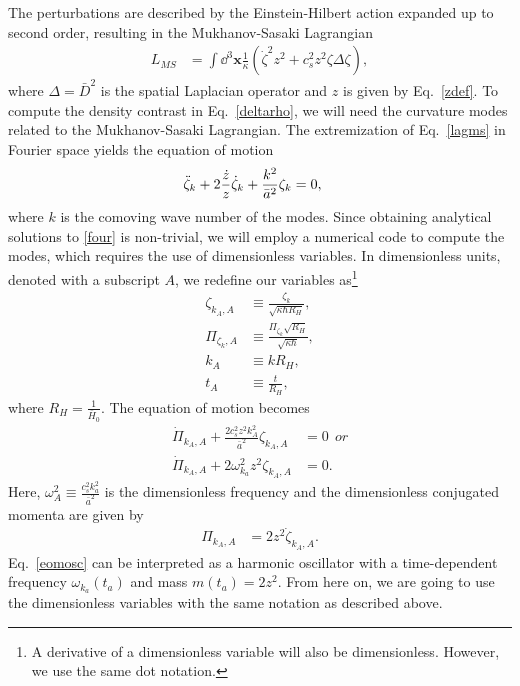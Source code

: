 \documentclass[a4paper,11pt]{article}
\begin{document}
The perturbations are described by the Einstein-Hilbert action expanded up to second
order, resulting in the Mukhanov-Sasaki Lagrangian
\begin{align}
	\label{lagms}
	L_{MS} & = \int \dd^3\textbf{x} \frac{1}{ \kappa} \left({\dot{\zeta}}^2 z^2 + c_s^2 z^2 \zeta\Delta \zeta\right)
	,\end{align}
where $\Delta = \bar{D}^2$ is the spatial Laplacian operator and $z$ is given by
Eq.~\eqref{zdef}. To compute the density contrast in Eq.~\eqref{deltarho}, we will need
the curvature modes related to the Mukhanov-Sasaki Lagrangian. The extremization of
Eq.~\eqref{lagms} in Fourier space yields the equation of motion
\begin{align}
	\label{four}
	\Ddot{\zeta}_{k}+ 2\frac{ \dot{z} }{ z } \dot{\zeta}_k + \frac{k^2}{\bar{a}^2} \zeta_k & =0
	,\end{align}
where $k$ is the comoving wave number of the modes. Since obtaining analytical solutions
to \eqref{four} is non-trivial, we will employ a numerical code to compute the modes,
which requires the use of dimensionless variables. In dimensionless units, denoted with
a subscript $A$, we redefine our variables as\footnote{A derivative of a dimensionless
	variable will also be dimensionless. However, we use the same dot notation.}
\begin{align}
	\zeta_{k_A, A}   & \equiv \frac{\zeta_{k}}{\sqrt{ \kappa \hbar R_H}},           \\
	\Pi_{\zeta_k, A} & \equiv \frac{\Pi_{\zeta_k} \sqrt{R_H}}{\sqrt{\kappa \hbar}}, \\
	\label{kadm}
	k_A              & \equiv k R_H,                                                \\
	t_A              & \equiv \frac{t}{R_H}
	,\end{align}
where $R_H = \frac{1}{\bar{H}_0}$. The equation of motion becomes
\begin{align}
	\label{eomosc}
	\dot{\Pi}_{k_A, A}+  \frac{2 c^2_s z^2 k_A^2}{\bar{a}^2  } \zeta_{k_A, A} & =0 \nonumber~~ or \\
	\dot{\Pi}_{k_A, A}+  2 \omega_{k_a}^2 z^2  \zeta_{k_A, A}                 & =0
	.\end{align}
Here, $\omega_A^2 \equiv \frac{c_s^2 k_a^2}{\bar{a}^2}$ is the dimensionless frequency
and the dimensionless conjugated momenta are given by
\begin{align}
	\Pi_{k_A, A} & = 2 z^2 \dot{\zeta}_{k_A, A}
	.\end{align}
Eq.~\eqref{eomosc} can be interpreted as a harmonic oscillator with a time-dependent
frequency $\omega_{k_a}(t_a)$ and mass $m(t_a) = 2z^2$. From here on, we are going to
use the dimensionless variables with the same notation as described above.
\end{document}
